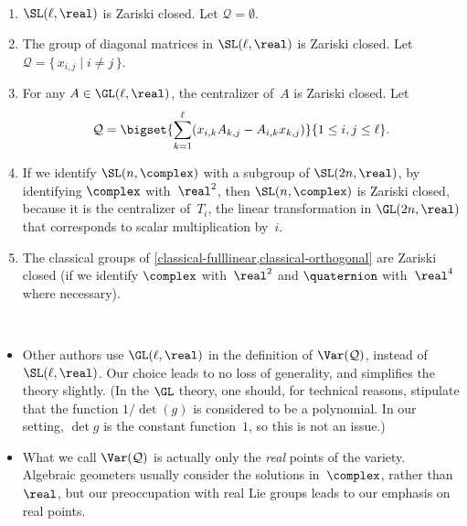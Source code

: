 \begin{eg} \label{EgZarClosed}
 \ 
 \begin{enumerate}
 \item $\SL(\ell,\real)$ is Zariski closed. Let $\mathcal{Q}
= \emptyset$.
 \item \label{EgZarClosed-diag}
 The group of diagonal matrices in $\SL(\ell,\real)$
is Zariski closed. Let 
 $\mathcal{Q} = \{\, x_{i,j} \mid i \neq j \,\}$.
 \item \label{EgZarClosed-central}
 For any $A \in \GL(\ell,\real)$, the centralizer
of~$A$ is Zariski closed. Let
 $$ \mathcal{Q} = \bigset{
 \sum_{k=1}^\ell ( x_{i,k} A_{k,j}
-  A_{i,k} x_{k,j}) 
 }{
 1 \le i,j\le \ell 
 }.$$
 \item \label{EgZarClosed-SLnC}
 If we identify $\SL(n,\complex)$ with a subgroup of
$\SL(2n,\real)$, by identifying $\complex$ with~$\real^2$,
then $\SL(n,\complex)$ is Zariski closed, because it is the
centralizer of~$T_i$, the linear transformation in
$\GL(2n,\real)$ that corresponds to scalar multiplication
by~$i$.
 \item The classical groups of \cref{classical-fulllinear,classical-orthogonal} are Zariski closed (if we
identify $\complex$ with~$\real^2$ and $\quaternion$
with~$\real^4$ where necessary).
 \end{enumerate}
 \end{eg}

\begin{terminology} \ 
\noprelistbreak
 \begin{itemize}
 \item Other authors use $\GL(\ell,\real)$ in the definition
of $\Var(\mathcal{Q})$, instead of $\SL(\ell,\real)$. Our
choice leads to no loss of generality, and simplifies the
theory slightly. (In the $\GL$ theory, one should, for
technical reasons, stipulate that the function $1/\det(g)$ is
considered to be a polynomial. In our setting, $\det g$ is the constant
function~$1$, so this is not an issue.)
 \item What we call $\Var(\mathcal{Q})$ is actually only the
\emph{real} points of the variety. Algebraic geometers
usually consider the solutions in~$\complex$, rather
than~$\real$, but our preoccupation with real Lie groups leads
to our emphasis on real points.
 \end{itemize}
 \end{terminology}

